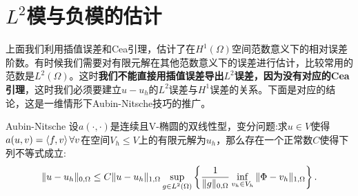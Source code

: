 \section{$L^{2}$模与负模的估计}
上面我们利用插值误差和Cea引理，估计了在$H^{1}(\Omega)$空间范数意义下的相对误差阶数。有时候我们需要对有限元解在其他范数意义下的误差进行估计，比较常用的范数是$L^{2}(\Omega)$。这时\textbf{我们不能直接用插值误差导出$L^{2}$误差，因为没有对应的Cea引理}，这时我们必须要建立$u-u_{h}$的$L^{2}$误差与$H^{1}$误差的关系。下面是对应的结论，这是一维情形下Aubin-Nitsche技巧的推广。
\begin{theorem}{Aubin-Nitsche}
    设$a(\cdot,\cdot)$是连续且V-椭圆的双线性型，变分问题:求$u\in V$使得$a(u,v)=\left<f,v\right>\forall v$在空间$V_{h}\le V$上的有限元解为$u_{h}$，那么存在一个正常数$C$使得下列不等式成立:
    \begin{equation}
        \|u-u_{h}\|_{0,\Omega}\le C\|u-u_{h}\|_{1,\Omega}\sup_{g\in L^{2}(\Omega)}\left\{\frac{1}{\|g\|_{0,\Omega}}\inf_{v_{h}\in V_{h}}\|\Phi-v_{h}\|_{1,\Omega}\right\}.
    \end{equation}
\end{theorem}